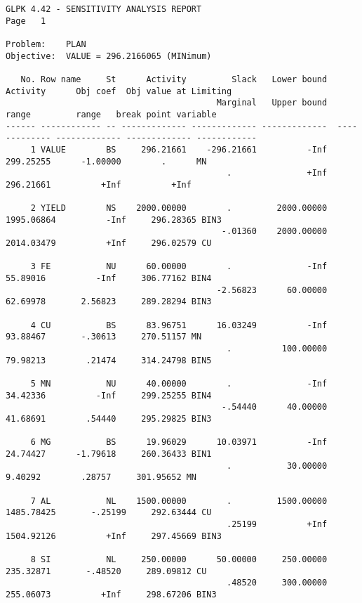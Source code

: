 \begin{landscape}
\begin{footnotesize}
\begin{verbatim}
GLPK 4.42 - SENSITIVITY ANALYSIS REPORT                                                                         Page   1

Problem:    PLAN
Objective:  VALUE = 296.2166065 (MINimum)

   No. Row name     St      Activity         Slack   Lower bound       Activity      Obj coef  Obj value at Limiting
                                          Marginal   Upper bound          range         range   break point variable
------ ------------ -- ------------- ------------- -------------  ------------- ------------- ------------- ------------
     1 VALUE        BS     296.21661    -296.21661          -Inf      299.25255      -1.00000        .      MN
                                            .               +Inf      296.21661          +Inf          +Inf

     2 YIELD        NS    2000.00000        .         2000.00000     1995.06864          -Inf     296.28365 BIN3
                                           -.01360    2000.00000     2014.03479          +Inf     296.02579 CU

     3 FE           NU      60.00000        .               -Inf       55.89016          -Inf     306.77162 BIN4
                                          -2.56823      60.00000       62.69978       2.56823     289.28294 BIN3

     4 CU           BS      83.96751      16.03249          -Inf       93.88467       -.30613     270.51157 MN
                                            .          100.00000       79.98213        .21474     314.24798 BIN5

     5 MN           NU      40.00000        .               -Inf       34.42336          -Inf     299.25255 BIN4
                                           -.54440      40.00000       41.68691        .54440     295.29825 BIN3

     6 MG           BS      19.96029      10.03971          -Inf       24.74427      -1.79618     260.36433 BIN1
                                            .           30.00000        9.40292        .28757     301.95652 MN

     7 AL           NL    1500.00000        .         1500.00000     1485.78425       -.25199     292.63444 CU
                                            .25199          +Inf     1504.92126          +Inf     297.45669 BIN3

     8 SI           NL     250.00000      50.00000     250.00000      235.32871       -.48520     289.09812 CU
                                            .48520     300.00000      255.06073          +Inf     298.67206 BIN3
\end{verbatim}
\end{footnotesize}
\end{landscape}

